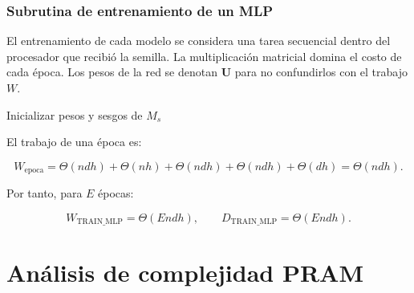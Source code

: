 \documentclass[11pt,a4paper]{article}
\begin{document}
\subsubsection{Subrutina de entrenamiento de un MLP}

El entrenamiento de cada modelo se considera una tarea secuencial dentro del procesador
que recibió la semilla. La multiplicación matricial domina el costo de cada época.
Los pesos de la red se denotan $\mathbf{U}$ para no confundirlos con el trabajo $W$.

\begin{algorithm}[H]
\caption{Subrutina \textsc{TRAIN\_MLP}}
\label{alg:train-mlp}

Inicializar pesos y sesgos de $M_s$


\end{algorithm}

El trabajo de una época es:

\begin{equation}
W_{\mathrm{epoca}}
=\Theta(ndh)+\Theta(nh)+\Theta(ndh)+\Theta(ndh)+\Theta(dh)
=\Theta(ndh).
\end{equation}

Por tanto, para $E$ épocas:

\begin{equation}
W_{\mathrm{TRAIN\_MLP}}=\Theta(Endh),
\qquad
D_{\mathrm{TRAIN\_MLP}}=\Theta(Endh).
\end{equation}


\section{Análisis de complejidad PRAM}
\end{document}
